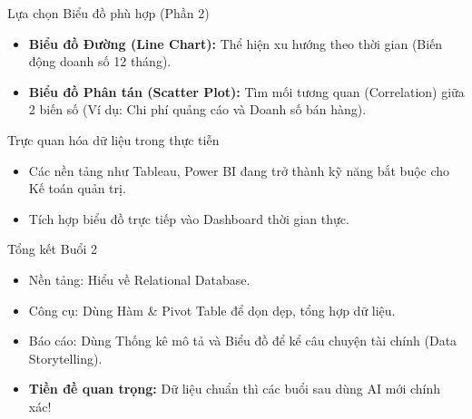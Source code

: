 \documentclass[aspectratio=169]{beamer}
\begin{document}
\begin{frame}{Lựa chọn Biểu đồ phù hợp (Phần 2)}
    \begin{itemize}
        \item \textbf{Biểu đồ Đường (Line Chart):} Thể hiện xu hướng theo thời gian (Biến động doanh số 12 tháng).
        \item \textbf{Biểu đồ Phân tán (Scatter Plot):} Tìm mối tương quan (Correlation) giữa 2 biến số (Ví dụ: Chi phí quảng cáo và Doanh số bán hàng).
    \end{itemize}
\end{frame}


\begin{frame}{Trực quan hóa dữ liệu trong thực tiễn}
    \begin{itemize}
        \item Các nền tảng như Tableau, Power BI đang trở thành kỹ năng bắt buộc cho Kế toán quản trị.
        \item Tích hợp biểu đồ trực tiếp vào Dashboard thời gian thực.
    \end{itemize}
\end{frame}


\begin{frame}{Tổng kết Buổi 2}
    \begin{itemize}
        \item Nền tảng: Hiểu về Relational Database.
        \item Công cụ: Dùng Hàm \& Pivot Table để dọn dẹp, tổng hợp dữ liệu.
        \item Báo cáo: Dùng Thống kê mô tả và Biểu đồ để kể câu chuyện tài chính (Data Storytelling).
        \item \textbf{Tiền đề quan trọng:} Dữ liệu chuẩn thì các buổi sau dùng AI mới chính xác!
    \end{itemize}
\end{frame}
\end{document}
